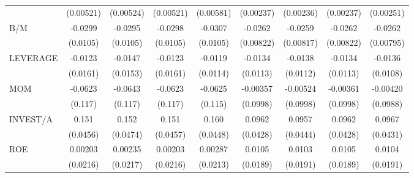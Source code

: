 \begin{table}[htbp]
\begin{tabular}{l*{8}{c}}
                    &   (0.00521)         &   (0.00524)         &   (0.00521)         &   (0.00581)         &   (0.00237)         &   (0.00236)         &   (0.00237)         &   (0.00251)         \\
B/M                 &     -0.0299\sym{***}&     -0.0295\sym{***}&     -0.0298\sym{***}&     -0.0307\sym{***}&     -0.0262\sym{***}&     -0.0259\sym{***}&     -0.0262\sym{***}&     -0.0262\sym{***}\\
                    &    (0.0105)         &    (0.0105)         &    (0.0105)         &    (0.0105)         &   (0.00822)         &   (0.00817)         &   (0.00822)         &   (0.00795)         \\
LEVERAGE            &     -0.0123         &     -0.0147         &     -0.0123         &     -0.0119         &     -0.0134         &     -0.0138         &     -0.0134         &     -0.0136         \\
                    &    (0.0161)         &    (0.0153)         &    (0.0161)         &    (0.0114)         &    (0.0113)         &    (0.0112)         &    (0.0113)         &    (0.0108)         \\
MOM                 &     -0.0623         &     -0.0643         &     -0.0623         &     -0.0625         &    -0.00357         &    -0.00524         &    -0.00361         &    -0.00420         \\
                    &     (0.117)         &     (0.117)         &     (0.117)         &     (0.115)         &    (0.0998)         &    (0.0998)         &    (0.0998)         &    (0.0988)         \\
INVEST/A            &       0.151\sym{***}&       0.152\sym{***}&       0.151\sym{***}&       0.160\sym{***}&      0.0962\sym{**} &      0.0957\sym{**} &      0.0962\sym{**} &      0.0967\sym{**} \\
                    &    (0.0456)         &    (0.0474)         &    (0.0457)         &    (0.0448)         &    (0.0428)         &    (0.0444)         &    (0.0428)         &    (0.0431)         \\
ROE                 &     0.00203         &     0.00235         &     0.00203         &     0.00287         &      0.0105         &      0.0103         &      0.0105         &      0.0104         \\
                    &    (0.0216)         &    (0.0217)         &    (0.0216)         &    (0.0213)         &    (0.0189)         &    (0.0191)         &    (0.0189)         &    (0.0191)         \\

\end{tabular}
\end{table}

